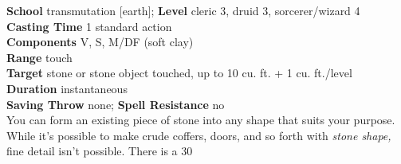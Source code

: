\textbf{School} transmutation [earth]; \textbf{Level} cleric 3, druid 3, sorcerer/wizard 4\\
\textbf{Casting Time} 1 standard action\\
\textbf{Components} V, S, M/DF (soft clay)\\
\textbf{Range} touch\\
\textbf{Target} stone or stone object touched, up to 10 cu. ft. + 1 cu. ft./level\\
\textbf{Duration} instantaneous\\
\textbf{Saving Throw} none; \textbf{Spell Resistance} no\\
You can form an existing piece of stone into any shape that suits your purpose. While it's possible to make crude coffers, doors, and so forth with \textit{stone shape, }fine detail isn't possible. There is a 30%
